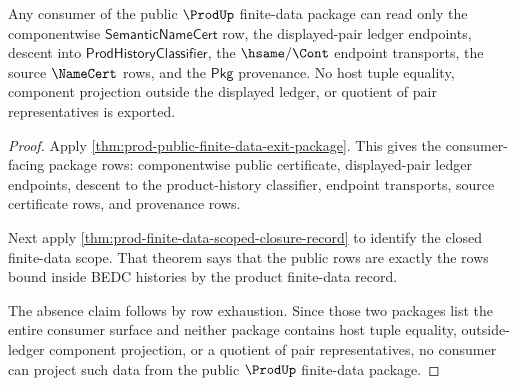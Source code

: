 \begin{theorem}
\label{thm:prod-finite-data-consumer-row-exhaustion}
Any consumer of the public $\ProdUp$ finite-data package can read only the
componentwise $\mathsf{SemanticNameCert}$ row, the displayed-pair ledger
endpoints, descent into $\mathsf{ProdHistoryClassifier}$, the $\hsame/\Cont$
endpoint transports, the source $\NameCert$ rows, and the $\mathsf{Pkg}$
provenance. No host tuple equality, component projection outside the displayed
ledger, or quotient of pair representatives is exported.
\end{theorem}
\begin{proof}
Apply \autoref{thm:prod-public-finite-data-exit-package}. This gives the
consumer-facing package rows: componentwise public certificate, displayed-pair
ledger endpoints, descent to the product-history classifier, endpoint
transports, source certificate rows, and provenance rows.

Next apply \autoref{thm:prod-finite-data-scoped-closure-record} to identify the
closed finite-data scope. That theorem says that the public rows are exactly
the rows bound inside BEDC histories by the product finite-data record.

The absence claim follows by row exhaustion. Since those two packages list the
entire consumer surface and neither package contains host tuple equality,
outside-ledger component projection, or a quotient of pair representatives, no
consumer can project such data from the public $\ProdUp$ finite-data package.
\end{proof}

